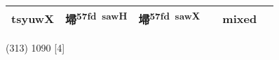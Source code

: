 \documentclass[14pt,a4paper]{scrartcl}
\begin{document}
\begin{longtable}[c]{@{}llllll@{}}
\begin{minipage}[t]{0.14\columnwidth}
tsyuwX
\strut\end{minipage} &
\begin{minipage}[t]{0.14\columnwidth}\raggedright\strut
埽\textsuperscript{57fd~sawH}
\strut\end{minipage} &
\begin{minipage}[t]{0.14\columnwidth}\raggedright\strut
埽\textsuperscript{57fd~sawX}
\strut\end{minipage} &
\begin{minipage}[t]{0.14\columnwidth}\raggedright\strut
\strut\end{minipage} &
\begin{minipage}[t]{0.14\columnwidth}\raggedright\strut
mixed
\strut\end{minipage}\tabularnewline
\bottomrule
\end{longtable}

(313) 1090 {[}4{]}
\end{document}
